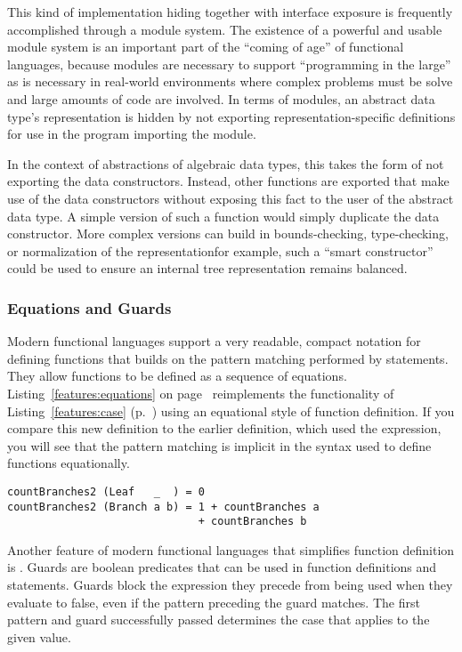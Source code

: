 This kind of implementation hiding together with interface exposure is frequently accomplished through a module system. The existence of a powerful and usable module system is an important part of the ``coming of age'' of functional languages, because modules are necessary to support ``programming in the large'' as is necessary in real-world environments where complex problems must be solve and large amounts of code are involved. In terms of modules, an abstract data type's representation is hidden by not exporting representation-specific definitions for use in the program importing the module.

In the context of abstractions of algebraic data types, this takes the form of not exporting the data constructors. Instead, other functions are exported that make use of the data constructors without exposing this fact to the user of the abstract data type. A simple version of such a function would simply duplicate the data constructor. More complex versions can build in bounds-checking, type-checking, or normalization of the representation\empause for example, such a ``smart constructor'' could be used to ensure an internal tree representation remains balanced.

\subsubsection{Equations and Guards}
Modern functional languages support a very readable, compact notation for defining functions that builds on the pattern matching performed by  statements. They allow functions to be defined as a sequence of equations. Listing~\ref{features:equations} on page~\pageref{features:equations} reimplements the functionality of Listing~\ref{features:case} (p.~\pageref{features:case}) using an equational style of function definition. If you compare this new definition to the earlier definition, which used the  expression, you will see that the pattern matching is implicit in the syntax used to define functions equationally.

\begin{lstlisting}[float,caption={Pattern-matching via equational function definition},label={features:equations}]
countBranches2 (Leaf   _  ) = 0
countBranches2 (Branch a b) = 1 + countBranches a
                              + countBranches b
\end{lstlisting}


Another feature of modern functional languages that simplifies function definition is . Guards are boolean predicates that can be used in function definitions and  statements. Guards block the expression they precede from being used when they evaluate to false, even if the pattern preceding the guard matches. The first pattern and guard successfully passed determines the case that applies to the given value.

